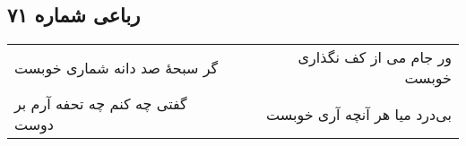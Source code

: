 \begin{center}
\section*{رباعی شماره ۷۱}
\label{sec:sh071}
\begin{longtable}{l p{0.5cm} r}
گر سبحهٔ صد دانه شماری خوبست
&&
ور جام می از کف نگذاری خوبست
\\
گفتی چه کنم چه تحفه آرم بر دوست
&&
بی‌درد میا هر آنچه آری خوبست
\\
\end{longtable}
\end{center}
